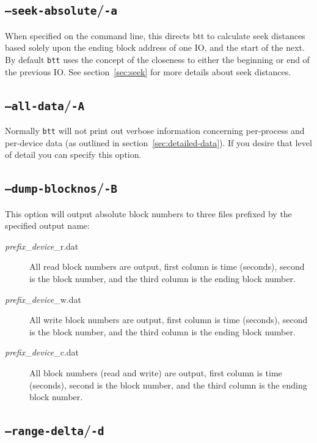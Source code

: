 \documentclass{article}
\begin{document}
\subsection{\label{sec:o-a}\texttt{--seek-absolute}/\texttt{-a}}

  When specified on the command line, this directs btt to calculate
  seek distances based solely upon the ending block address of one IO,
  and the start of the next.  By default \texttt{btt} uses the concept
  of the closeness to either the beginning or end of the previous IO. See
  section~\ref{sec:seek} for more details about seek distances.

\subsection{\label{sec:o-A}\texttt{--all-data}/\texttt{-A}}

  Normally \texttt{btt} will not print out verbose information
  concerning per-process and per-device data (as outlined in
  section~\ref{sec:detailed-data}). If you desire that level of
  detail you can specify this option.

\subsection{\label{sec:o-B}\texttt{--dump-blocknos}/\texttt{-B}}

  This option will output absolute block numbers to three files prefixed
  by the specified output name:

  \begin{description}
    \item[\emph{prefix}\_\emph{device}\_r.dat] All read block numbers are
    output, first column is time (seconds), second is the block number,
    and the third column is the ending block number.

    \item[\emph{prefix}\_\emph{device}\_w.dat] All write block numbers are
    output, first column is time (seconds), second is the block number,
    and the third column is the ending block number.

    \item[\emph{prefix}\_\emph{device}\_c.dat] All block numbers (read
    and write) are output, first column is time (seconds), second is
    the block number, and the third column is the ending block number.
  \end{description}

\subsection{\label{sec:o-d}\texttt{--range-delta}/\texttt{-d}}
\end{document}
